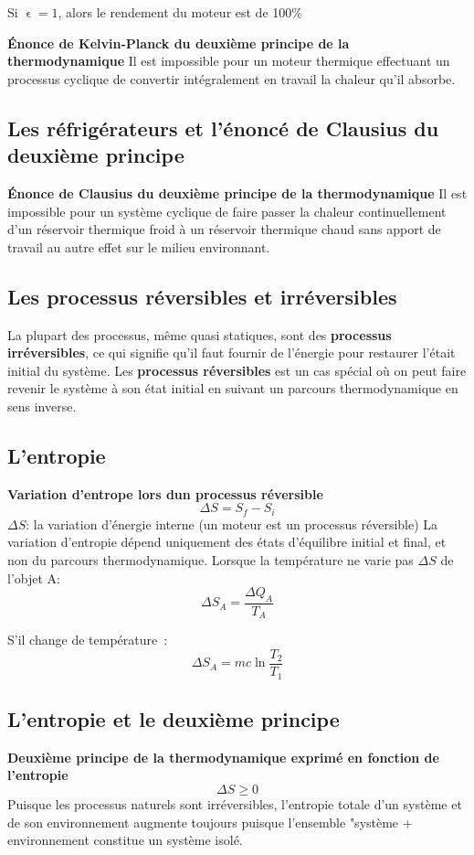 \documentclass{article}
\begin{document}
Si $\upvarepsilon = 1$, alors le rendement du moteur est de 100\%
\newline

\noindent
\textbf{Énonce de Kelvin-Planck du deuxième principe de la thermodynamique}
\newline
Il est impossible pour un moteur thermique effectuant un processus cyclique de convertir intégralement en travail la chaleur qu'il absorbe.
\newline

\subsection{Les réfrigérateurs et l'énoncé de Clausius du deuxième principe}
\noindent
\textbf{Énonce de Clausius du deuxième principe de la thermodynamique}
\newline
Il est impossible pour un système cyclique de faire passer la chaleur continuellement d'un réservoir thermique froid à un réservoir thermique chaud sans apport de travail au autre effet sur le milieu environnant.


\subsection{Les processus réversibles et irréversibles}
La plupart des processus, même quasi statiques, sont des \textbf{processus irréversibles}, ce qui signifie qu'il faut fournir de l'énergie pour restaurer l'était initial du système. Les \textbf{processus réversibles} est un cas spécial où on peut faire revenir le système à son état initial en suivant un parcours thermodynamique en sens inverse.

\subsection{L'entropie}
\textbf{Variation d'entrope lors dun processus réversible}
\[\Delta S = S_f - S_i\]
$\Delta S$: la variation d'énergie interne (un moteur est un processus réversible)
\newline
La variation d'entropie dépend uniquement des états d'équilibre initial et final, et non du parcours thermodynamique.
\newline
Lorsque la température ne varie pas $\Delta S$ de l'objet A:
\[\Delta S_{A} = \frac{\Delta Q_{A}}{T_{A}}\]

S'il change de température :
\[\Delta S_{A} = mc\ln{\frac{T_2}{T_1}}\]

\subsection{L'entropie et le deuxième principe}
\textbf{Deuxième principe de la thermodynamique exprimé en fonction de l'entropie}
\[\Delta S \geq 0\]
Puisque les processus naturels sont irréversibles, l'entropie totale d'un système et de son environnement augmente toujours puisque l'ensemble "système + environnement constitue un système isolé.
\end{document}
